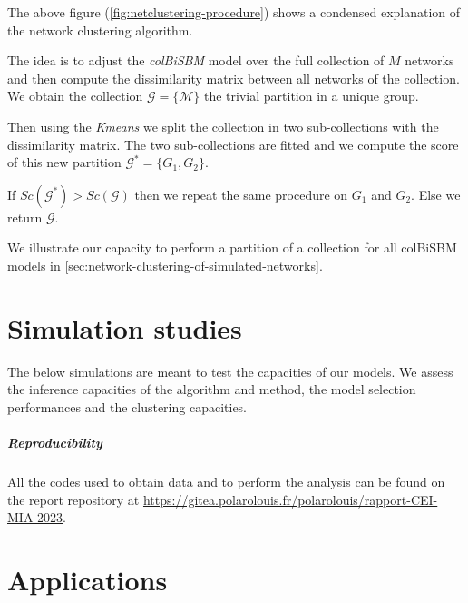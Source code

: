 \documentclass[12pt,a4paper]{report}
\begin{document}
The above figure (\ref{fig:netclustering-procedure}) shows a condensed
explanation of the network clustering algorithm.

The idea is to adjust the \emph{colBiSBM} model over the full collection of $M$
networks and then compute the dissimilarity matrix between all networks of the
collection. We obtain the collection $\mathcal{G} = \{\mathcal{M}\}$ the trivial
partition in a unique group.

Then using the \emph{Kmeans} we split the collection in two sub-collections with
the dissimilarity matrix. The two sub-collections are fitted and we compute
the score of this new partition $\mathcal{G}^{*} = \{G_1, G_2\}$.

If $Sc(\mathcal{G}^{*}) > Sc(\mathcal{G})$ then we repeat the same procedure on
$G_1$ and $G_2$. Else we return $\mathcal{G}$.

We illustrate our capacity to perform a partition of a collection for all
colBiSBM models in \ref{sec:network-clustering-of-simulated-networks}.

\chapter{Simulation studies}\label{chap:simulation-studies}

The below simulations are meant to test the capacities of our models.
We assess the inference capacities of the algorithm and method, the model
selection performances and the clustering capacities.

\paragraph{Reproducibility} All the codes used to obtain data and to perform the
analysis can be found on the report repository at
\url{https://gitea.polarolouis.fr/polarolouis/rapport-CEI-MIA-2023}.





\chapter{Applications}



\printbibliography
\listoffigures
\listoftables
\end{document}
